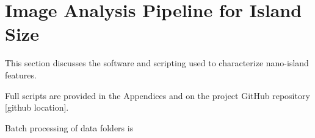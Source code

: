 

\section{Image Analysis Pipeline for Island Size}

This section discusses the software and scripting used to characterize nano-island features.  

Full scripts are provided in the Appendices and on the project GitHub repository [github location]. 

Batch processing of data folders is 






